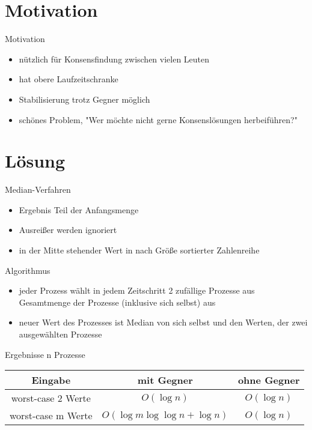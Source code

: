 \documentclass{beamer}
\begin{document}
    \section{Motivation}
    \begin{frame}{Motivation}
        \begin{itemize}
            \item nützlich für Konsensfindung zwischen vielen Leuten
            \vfill
            \item hat obere Laufzeitschranke
            \vfill
            \item Stabilisierung trotz Gegner möglich
            \vfill
            \item schönes Problem, "Wer möchte nicht gerne Konsenslösungen
                  herbeiführen?"
        \end{itemize}
    \end{frame}

    \section{Lösung}

    \begin{frame}{Median-Verfahren}
        \begin{itemize}
            \item Ergebnis Teil der Anfangsmenge
            \vfill
            \item Ausreißer werden ignoriert
            \vfill
            \item in der Mitte stehender Wert in nach Größe sortierter
                  Zahlenreihe
        \end{itemize}
    \end{frame}

    \begin{frame}{Algorithmus}
        \begin{itemize}
            \item jeder Prozess wählt in jedem Zeitschritt 2 zufällige
                  Prozesse aus Gesamtmenge der Prozesse (inklusive sich selbst)
                  aus
            \vfill
            \item neuer Wert des Prozesses ist Median von sich selbst und den
                  Werten, der zwei ausgewählten Prozesse
        \end{itemize}
    \end{frame}

    \begin{frame}{Ergebnisse}
        n Prozesse
        \vfill
        \begin{tabular}{c|c|c}
            Eingabe & mit Gegner & ohne Gegner\\
            \hline
            worst-case 2 Werte & \(O(\log n)\) & \(O(\log n)\) \\
            \hline
            worst-case m Werte & \(O(\log m \log \log n + \log n)\) & \(O(\log n)\)
        \end{tabular}
    \end{frame}
\end{document}
